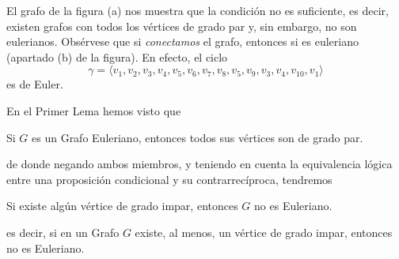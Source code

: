 \begin{center}
\begin{figure}[H]
{\begin{minipage}{3cm}
\begin{center}

\end{center}
\end{minipage}}
\end{figure}
\end{center}

El grafo de la figura (a) nos muestra que la condición no es suficiente, es decir, existen grafos con todos los vértices de grado par y, sin embargo, no son eulerianos. Obsérvese que si \emph{conectamos} el grafo, entonces si es euleriano (apartado (b) de la figura). En efecto, el ciclo
\[ \gamma = \langle v_1, v_2, v_3, v_4, v_5, v_6, v_7, v_8, v_5, v_9, v_3, v_4, v_{10}, v_1 \rangle \]
es de Euler.\\

\begin{nota}
En el Primer Lema hemos visto que\\
\begin{center} Si $G$ es un Grafo Euleriano, entonces todos sus vértices son de grado par. \end{center}
de donde negando ambos miembros, y teniendo en cuenta la equivalencia lógica entre una proposición condicional y su contrarrecíproca, tendremos
\begin{center} Si existe algún vértice de grado impar, entonces $G$ no es Euleriano. \end{center}
es decir, si en un Grafo $G$ existe, al menos, un vértice de grado impar, entonces no es Euleriano.\\
\end{nota}

